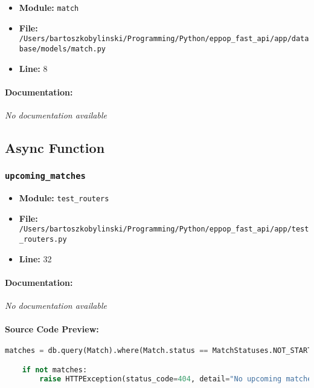 \documentclass[11pt,a4paper]{article}
\begin{document}
\begin{itemize}
    \item \textbf{Module:} \texttt{match}
    \item \textbf{File:} \texttt{/Users/bartoszkobylinski/Programming/Python/eppop\_fast\_api/app/database/models/match.py}
    \item \textbf{Line:} 8
\end{itemize}

\paragraph{Documentation:} \textit{No documentation available}


\vspace{1em}
\subsection{Async Function}

\subsubsection{\texttt{upcoming\_matches}}

\begin{itemize}
    \item \textbf{Module:} \texttt{test\_routers}
    \item \textbf{File:} \texttt{/Users/bartoszkobylinski/Programming/Python/eppop\_fast\_api/app/test\_routers.py}
    \item \textbf{Line:} 32
\end{itemize}

\paragraph{Documentation:} \textit{No documentation available}

\paragraph{Source Code Preview:}
\begin{lstlisting}[language=Python]
    matches = db.query(Match).where(Match.status == MatchStatuses.NOT_STARTED.value).join(Match.tournament).all()

    if not matches:
        raise HTTPException(status_code=404, detail="No upcoming matches found")

\end{lstlisting}
\end{document}
